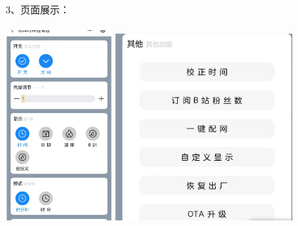 \documentclass[16pt]{beamer}	%
\begin{document}
		\begin{frame}
			\small 3、页面展示：\\ \hspace*{\fill} \\
			 \includegraphics[width=0.3\textwidth]{pic/3-1.png}           \includegraphics[width=0.5\textwidth]{pic/3-2.png} 
		\end{frame}
\end{document}
